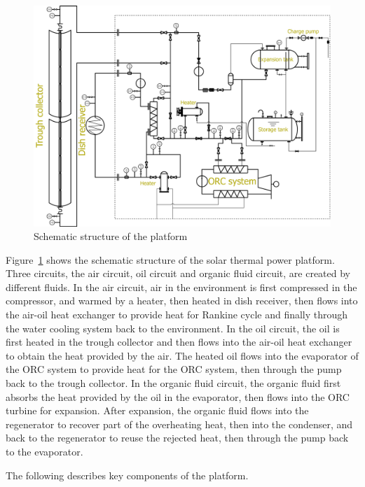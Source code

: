 \begin{figure}[!ht]
\centering
\includegraphics[width=1.0\textwidth]{fig/platform.jpg}
\caption{Schematic structure of the platform}\label{fig:platform}
\end{figure}
Figure~\ref{fig:platform} shows the schematic structure of the solar thermal power platform. 
Three circuits, the air circuit, oil circuit and organic fluid circuit, are created by different fluids. In the air circuit, air in the environment is first compressed in the compressor, and warmed by a heater, 
then heated in dish receiver, then flows into the air-oil heat exchanger to provide heat for Rankine cycle and finally through the water cooling system back to the environment. 
In the oil circuit, the oil is first heated in the trough collector and then flows into the air-oil heat exchanger to obtain the heat provided by the air. The heated oil flows 
into the evaporator of the ORC system to provide heat for the ORC system, then through the pump back to the trough collector.
In the organic fluid circuit, the organic fluid first absorbs the heat provided by the oil in the evaporator, then flows into the ORC turbine for expansion. After expansion, the organic fluid flows into the regenerator to recover part of the overheating heat, then into the condenser, and back to the regenerator to reuse the rejected heat, then through the pump back to the evaporator.

The following describes key components of the platform.

